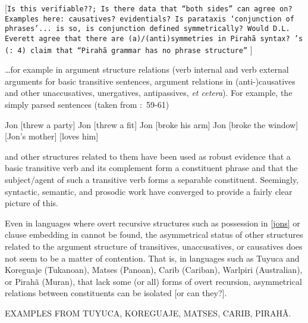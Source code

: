 \documentclass[11pt]{article}
\newcommand{\pgposscitet}[2]{\citeauthor{#1}'s (\citeyear{#1}:~#2)}
\newcommand{\pgcitealt}[2]{\citealt{#1}:~#2}
\begin{document}
[\texttt{Is this verifiable??; Is there data that ``both sides'' can agree on? Examples here: causatives? evidentials? Is parataxis `conjunction of phrases'... is so, is conjunction defined symmetrically? Would D.L. Everett agree that there are (a)/(anti)symmetries in Pirah\~a syntax? \pgposscitet{everett07replynevins}{4} claim that ``Pirah\~a grammar has no phrase structure''} ]

\ldots for example in argument structure relations (verb internal and verb external arguments for basic transitive sentences, argument relations in (anti-)causatives and other unaccusatives, unergatives, antipassives, \textsl{et cetera}). For example, the simply parsed sentences (taken from \pgcitealt{chomsky86knowledge}{59-61}) 

\begin{exe}
\ex Jon [threw a party]
\ex Jon [threw a fit]
\ex Jon [broke his arm]
\ex Jon [broke the window]
\ex {}[Jon's mother] [loves him]\label{jons}
\end{exe}

and other structures related to them have been used as robust evidence that a basic transitive verb and its complement form a constituent phrase and that the subject/agent of such a transitive verb forms a separable constituent. Seemingly, syntactic, semantic, and prosodic work have converged to provide a fairly clear picture of this.

Even in languages where overt recursive structures such as possession in \ref{jons} or clause embedding in cannot be found, the asymmetrical status of other structures related to the argument structure of transitives, unaccusatives, or causatives does not seem to be a matter of contention. That is, in languages such as Tuyuca and Koreguaje (Tukanoan), Matses (Panoan), Carib (Cariban), Warlpiri (Australian), or Pirah\~a (Muran), that lack some (or all) forms of overt recursion, asymmetrical relations between constituents can be isolated [or can they?].


EXAMPLES FROM TUYUCA, KOREGUAJE, MATSES, CARIB, PIRAH\~A.
\end{document}
